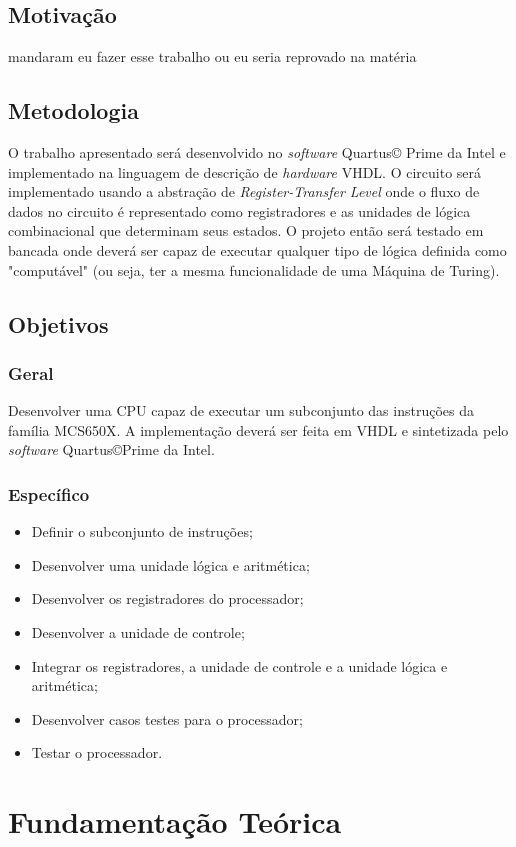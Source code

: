 \documentclass[
	12pt,				  %
	openright,		%
	a4paper,			%
	english,			%
	french,				%
	spanish,			%
	brazil,				%
]{abntex2}
\begin{document}
\section{Motivação}
mandaram eu fazer esse trabalho ou eu seria reprovado na matéria
\section{Metodologia}
O trabalho apresentado será desenvolvido no \emph{software} Quartus\copyright
Prime da Intel e implementado na linguagem de descrição de \emph{hardware} VHDL.
O circuito será implementado usando a abstração de
\emph{Register-Transfer Level} onde o fluxo de dados no circuito é representado
como registradores e as unidades de lógica combinacional que determinam seus
estados. O projeto então será testado em bancada onde deverá ser capaz de
executar qualquer tipo de lógica definida como "computável" (ou seja, ter a
mesma funcionalidade de uma Máquina de Turing).


\section{Objetivos}
\subsection*{Geral}
Desenvolver uma CPU capaz de executar um subconjunto das instruções da família
MCS650X. A implementação deverá ser feita em VHDL e sintetizada pelo
\emph{software} Quartus\copyright Prime da Intel.
\subsection*{Específico}
\begin{itemize}
	\item Definir o subconjunto de instruções;
	\item Desenvolver uma unidade lógica e aritmética;
	\item Desenvolver os registradores do processador;
	\item Desenvolver a unidade de controle;
	\item Integrar os registradores, a unidade de controle e a unidade lógica e
	      aritmética;
	\item Desenvolver casos testes para o processador;
	\item Testar o processador.
\end{itemize}

\chapter{Fundamentação Teórica}
\end{document}
